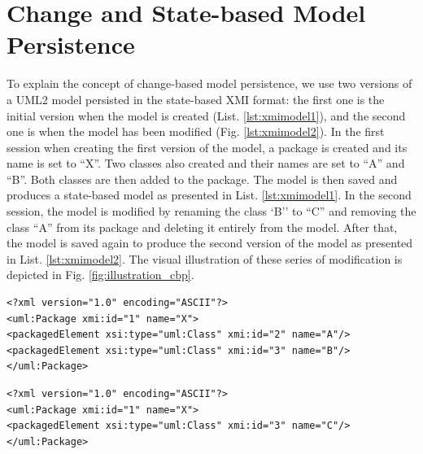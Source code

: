 \documentclass[10pt,conference]{IEEEtran}
\begin{document}
\section{Change and State-based Model Persistence}
\label{sec:change_and_state_based_model_persistence}
To explain the concept of change-based model persistence, we use two versions of a UML2 \cite{eclipse2017uml2} model persisted in the state-based XMI format: the first one is the initial version when the model is created (List. \ref{lst:xmimodel1}), and the second one is when the model has been modified (Fig. \ref{lst:xmimodel2}). In the first session when creating the first version of the model, a package is created and its name is set to ``X''. Two classes also created and their names are set to ``A'' and ``B''. Both classes are then added to the package. The model is then saved and produces a state-based model as presented in List. \ref{lst:xmimodel1}. In the second session, the model is modified by renaming the class `B'' to ``C'' and removing the class ``A'' from its package and deleting it entirely from the model. After that, the model is saved again to produce the second version of the model as presented in List. \ref{lst:xmimodel2}. The visual illustration of these series of modification is depicted in Fig. \ref{fig:illustration_cbp}.

\begin{lstlisting}[style=xmi,caption={The first version of the UML2 example model in XMI format after the first session.},label=lst:xmimodel1]
<?xml version="1.0" encoding="ASCII"?>
<uml:Package xmi:id="1" name="X">
<packagedElement xsi:type="uml:Class" xmi:id="2" name="A"/>
<packagedElement xsi:type="uml:Class" xmi:id="3" name="B"/>
</uml:Package>
\end{lstlisting}

\begin{lstlisting}[style=xmi,caption={The second version of the UML2 example model in XMI format after the second session.},label=lst:xmimodel2]
<?xml version="1.0" encoding="ASCII"?>
<uml:Package xmi:id="1" name="X">
<packagedElement xsi:type="uml:Class" xmi:id="3" name="C"/>
</uml:Package>
\end{lstlisting}
\end{document}
